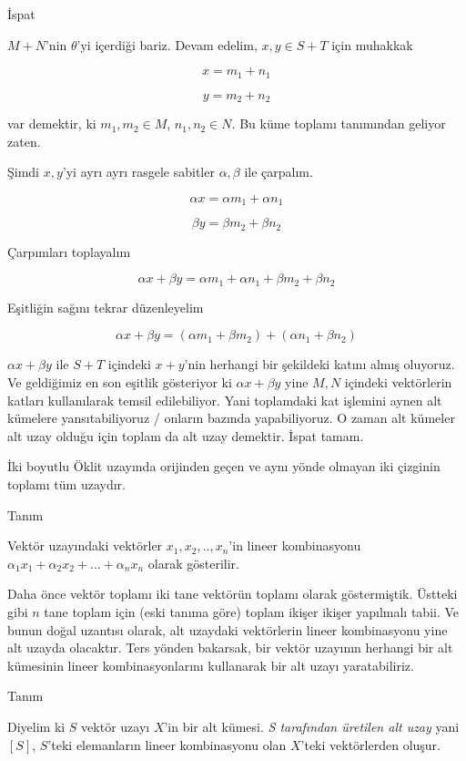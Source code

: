 \documentclass[12pt,fleqn]{article}\usepackage{../../common}
\begin{document}
İspat 

$M+N$'nin $\theta$'yi içerdiği bariz. Devam edelim, $x,y \in S+T$ için
muhakkak 

$$ x = m_1 + n_1 $$

$$ y = m_2 + n_2 $$

var demektir, ki $m_1,m_2 \in M$, $n_1,n_2 \in N$. Bu küme toplamı
tanımından geliyor zaten. 

Şimdi $x,y$'yi ayrı ayrı rasgele sabitler $\alpha,\beta$ ile çarpalım. 

$$
\alpha x = \alpha m_1 + \alpha n_1
$$

$$
\beta y = \beta m_2 + \beta n_2
$$

Çarpımları toplayalım

$$
\alpha x + \beta y  = \alpha m_1 + \alpha n_1 + \beta m_2 + \beta n_2
$$

Eşitliğin sağını tekrar düzenleyelim

$$
\alpha x + \beta y  = (\alpha m_1 + \beta m_2) + (\alpha n_1  + \beta n_2 )
$$

$\alpha x + \beta y$ ile $S+T$ içindeki $x+y$'nin herhangi bir şekildeki
katını almış oluyoruz. Ve geldiğimiz en son eşitlik gösteriyor 
ki $\alpha x + \beta y$ yine $M,N$ içindeki vektörlerin katları kullanılarak 
temsil edilebiliyor. Yani toplamdaki kat işlemini aynen alt kümelere
yansıtabiliyoruz / onların bazında yapabiliyoruz. O zaman alt kümeler alt
uzay olduğu için toplam da alt uzay demektir. İspat tamam.

İki boyutlu Öklit uzayında orijinden geçen ve aynı yönde olmayan iki çizginin
toplamı tüm uzaydır. 

Tanım

Vektör uzayındaki vektörler $x_1,x_2,..,x_n$'in lineer kombinasyonu
$\alpha_1 x_1 + \alpha_2 x_2 + ... + \alpha_n x_n$ olarak gösterilir. 

Daha önce vektör toplamı iki tane vektörün toplamı olarak
göstermiştik. Üstteki gibi $n$ tane toplam için (eski tanıma göre) toplam
ikişer ikişer yapılmalı tabii. Ve bunun doğal uzantısı olarak, alt
uzaydaki vektörlerin lineer kombinasyonu yine alt uzayda olacaktır. Ters
yönden bakarsak, bir vektör uzayının herhangi bir alt kümesinin lineer
kombinasyonlarını kullanarak bir alt uzayı yaratabiliriz. 

Tanım

Diyelim ki $S$ vektör uzayı $X$'in bir alt kümesi. {\em S tarafından
  üretilen alt uzay} yani $[S]$, $S$'teki elemanların lineer
kombinasyonu olan $X$'teki vektörlerden oluşur. 
\end{document}
